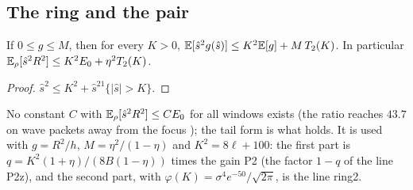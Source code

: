 \subsection{The ring and the pair}

\begin{lemma}[ring] \proofst
\label{lem:CZ4}
If $0\le g\le M$, then for every $K>0$, $\mathbb{E}[\hat s^2g(\hat s)]\le K^2\mathbb{E}[g]+M\,T_2(K)$. In particular $\mathbb{E}_\rho[\hat s^2R^2]\le K^2E_0+\eta^2T_2(K)$.
\end{lemma}
\begin{proof}
$\hat s^2\le K^2+\hat s^21\{|\hat s|>K\}$.
\end{proof}
No constant $C$ with $\mathbb{E}_\rho[\hat s^2R^2]\le CE_0$ for all windows exists (the ratio reaches $43.7$ on wave packets away from the focus \numst); the tail form is what holds.
It is used with $g=R^2/h$, $M=\eta^2/(1-\eta)$ and $K^2=8\ell+100$: the first part is $q=K^2(1+\eta)/(8B(1-\eta))$ times the gain P2 (the factor $1-q$ of the line P2z), and the second part, with $\varphi(K)=\sigma^4e^{-50}/\sqrt{2\pi}$, is the line ring2.


